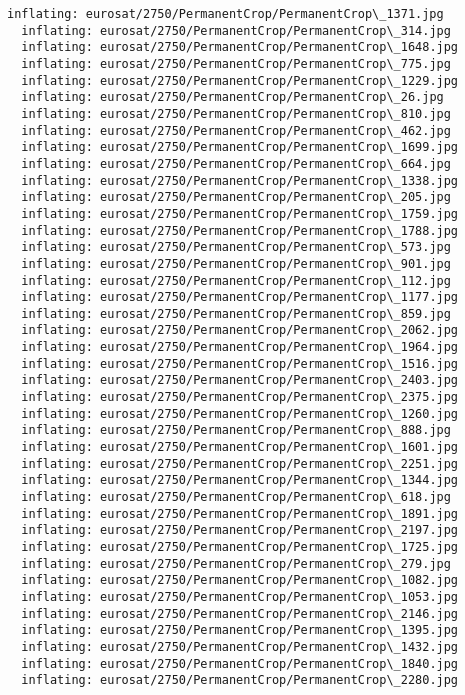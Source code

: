 \documentclass[11pt]{article}
\begin{document}
\begin{Verbatim}[commandchars=\\\{\}]
  inflating: eurosat/2750/PermanentCrop/PermanentCrop\_1371.jpg
  inflating: eurosat/2750/PermanentCrop/PermanentCrop\_314.jpg
  inflating: eurosat/2750/PermanentCrop/PermanentCrop\_1648.jpg
  inflating: eurosat/2750/PermanentCrop/PermanentCrop\_775.jpg
  inflating: eurosat/2750/PermanentCrop/PermanentCrop\_1229.jpg
  inflating: eurosat/2750/PermanentCrop/PermanentCrop\_26.jpg
  inflating: eurosat/2750/PermanentCrop/PermanentCrop\_810.jpg
  inflating: eurosat/2750/PermanentCrop/PermanentCrop\_462.jpg
  inflating: eurosat/2750/PermanentCrop/PermanentCrop\_1699.jpg
  inflating: eurosat/2750/PermanentCrop/PermanentCrop\_664.jpg
  inflating: eurosat/2750/PermanentCrop/PermanentCrop\_1338.jpg
  inflating: eurosat/2750/PermanentCrop/PermanentCrop\_205.jpg
  inflating: eurosat/2750/PermanentCrop/PermanentCrop\_1759.jpg
  inflating: eurosat/2750/PermanentCrop/PermanentCrop\_1788.jpg
  inflating: eurosat/2750/PermanentCrop/PermanentCrop\_573.jpg
  inflating: eurosat/2750/PermanentCrop/PermanentCrop\_901.jpg
  inflating: eurosat/2750/PermanentCrop/PermanentCrop\_112.jpg
  inflating: eurosat/2750/PermanentCrop/PermanentCrop\_1177.jpg
  inflating: eurosat/2750/PermanentCrop/PermanentCrop\_859.jpg
  inflating: eurosat/2750/PermanentCrop/PermanentCrop\_2062.jpg
  inflating: eurosat/2750/PermanentCrop/PermanentCrop\_1964.jpg
  inflating: eurosat/2750/PermanentCrop/PermanentCrop\_1516.jpg
  inflating: eurosat/2750/PermanentCrop/PermanentCrop\_2403.jpg
  inflating: eurosat/2750/PermanentCrop/PermanentCrop\_2375.jpg
  inflating: eurosat/2750/PermanentCrop/PermanentCrop\_1260.jpg
  inflating: eurosat/2750/PermanentCrop/PermanentCrop\_888.jpg
  inflating: eurosat/2750/PermanentCrop/PermanentCrop\_1601.jpg
  inflating: eurosat/2750/PermanentCrop/PermanentCrop\_2251.jpg
  inflating: eurosat/2750/PermanentCrop/PermanentCrop\_1344.jpg
  inflating: eurosat/2750/PermanentCrop/PermanentCrop\_618.jpg
  inflating: eurosat/2750/PermanentCrop/PermanentCrop\_1891.jpg
  inflating: eurosat/2750/PermanentCrop/PermanentCrop\_2197.jpg
  inflating: eurosat/2750/PermanentCrop/PermanentCrop\_1725.jpg
  inflating: eurosat/2750/PermanentCrop/PermanentCrop\_279.jpg
  inflating: eurosat/2750/PermanentCrop/PermanentCrop\_1082.jpg
  inflating: eurosat/2750/PermanentCrop/PermanentCrop\_1053.jpg
  inflating: eurosat/2750/PermanentCrop/PermanentCrop\_2146.jpg
  inflating: eurosat/2750/PermanentCrop/PermanentCrop\_1395.jpg
  inflating: eurosat/2750/PermanentCrop/PermanentCrop\_1432.jpg
  inflating: eurosat/2750/PermanentCrop/PermanentCrop\_1840.jpg
  inflating: eurosat/2750/PermanentCrop/PermanentCrop\_2280.jpg

\end{Verbatim}
\end{document}
